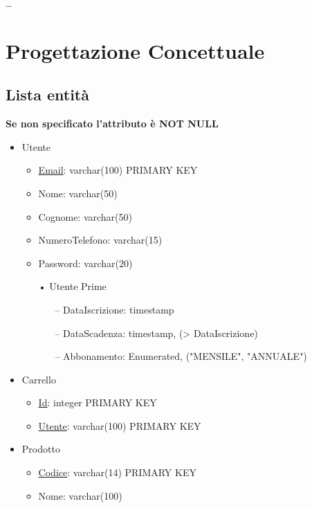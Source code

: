 \documentclass[11pt]{article}
\begin{document}
\dots

\section{Progettazione Concettuale}

\subsection{Lista entità}

\textbf{Se non specificato l'attributo è NOT NULL}
\begin{itemize}
    \item Utente
    \begin{itemize}
        \item \underline{Email}: varchar(100) PRIMARY KEY
        \item Nome: varchar(50)
        \item Cognome: varchar(50)
        \item NumeroTelefono: varchar(15)
        \item Password: varchar(20)
        \item[•] Utente Prime
        \begin{itemize}
            \item[–] DataIscrizione: timestamp
            \item[–] DataScadenza: timestamp, (\textgreater{} DataIscrizione)
            \item[–] Abbonamento: Enumerated, ("MENSILE", "ANNUALE")
        \end{itemize}
    \end{itemize}
    \item Carrello
    \begin{itemize}
        \item \underline{Id}: integer PRIMARY KEY
        \item \underline{Utente}: varchar(100) PRIMARY KEY
    \end{itemize}
    \item Prodotto
    \begin{itemize}
        \item \underline{Codice}: varchar(14) PRIMARY KEY
        \item Nome: varchar(100)

\end{itemize}
\end{itemize}
\end{document}
